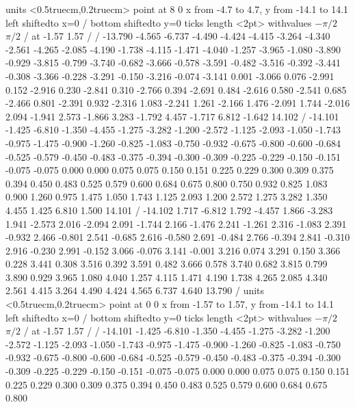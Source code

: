 \figure
\texonly
\vbox{\beginpicture
\normalgraphs
\sevenpoint
\setcoordinatesystem units <0.5truecm,0.2truecm> point at 8 0
\setplotarea x from -4.7 to 4.7, y from -14.1 to 14.1
\axis left shiftedto x=0 /
\axis bottom shiftedto y=0 ticks length <2pt> withvalues 
  {$-\pi/2$} {$\pi/2$} /
  at -1.57 1.57 / /
\setquadratic
{} -13.790 -4.565 -6.737 -4.490 -4.424 -4.415 -3.264 -4.340 -2.561 
-4.265 -2.085 -4.190 -1.738 -4.115 -1.471 -4.040 -1.257 -3.965 -1.080 
-3.890 -0.929 -3.815 -0.799 -3.740 -0.682 -3.666 -0.578 -3.591 -0.482 
-3.516 -0.392 -3.441 -0.308 -3.366 -0.228 -3.291 -0.150 -3.216 -0.074 
-3.141 0.001 -3.066 0.076 -2.991 0.152 -2.916 0.230 -2.841 0.310 
-2.766 0.394 -2.691 0.484 -2.616 0.580 -2.541 0.685 -2.466 0.801 
-2.391 0.932 -2.316 1.083 -2.241 1.261 -2.166 1.476 -2.091 1.744 
-2.016 2.094 -1.941 2.573 -1.866 3.283 -1.792 4.457 -1.717 6.812 
-1.642 14.102 /
 -14.101 -1.425 -6.810 -1.350 -4.455 -1.275 -3.282 -1.200 -2.572 
-1.125 -2.093 -1.050 -1.743 -0.975 -1.475 -0.900 -1.260 -0.825 -1.083 
-0.750 -0.932 -0.675 -0.800 -0.600 -0.684 -0.525 -0.579 -0.450 -0.483 
-0.375 -0.394 -0.300 -0.309 -0.225 -0.229 -0.150 -0.151 -0.075 -0.075 
0.000 0.000 0.075 0.075 0.150 0.151 0.225 0.229 0.300 0.309 
0.375 0.394 0.450 0.483 0.525 0.579 0.600 0.684 0.675 0.800 
0.750 0.932 0.825 1.083 0.900 1.260 0.975 1.475 1.050 1.743 
1.125 2.093 1.200 2.572 1.275 3.282 1.350 4.455 1.425 6.810 
1.500 14.101  /
 -14.102 1.717 -6.812 1.792 -4.457 1.866 -3.283 1.941 -2.573 
2.016 -2.094 2.091 -1.744 2.166 -1.476 2.241 -1.261 2.316 -1.083 
2.391 -0.932 2.466 -0.801 2.541 -0.685 2.616 -0.580 2.691 -0.484 
2.766 -0.394 2.841 -0.310 2.916 -0.230 2.991 -0.152 3.066 -0.076 
3.141 -0.001 3.216 0.074 3.291 0.150 3.366 0.228 3.441 0.308 
3.516 0.392 3.591 0.482 3.666 0.578 3.740 0.682 3.815 0.799 
3.890 0.929 3.965 1.080 4.040 1.257 4.115 1.471 4.190 1.738 
4.265 2.085 4.340 2.561 4.415 3.264 4.490 4.424 4.565 6.737 
4.640 13.790 /
\setcoordinatesystem units <0.5truecm,0.2truecm> point at 0 0
\setplotarea x from -1.57 to 1.57, y from -14.1 to 14.1
\axis left shiftedto x=0 /
\axis bottom shiftedto y=0 ticks length <2pt> withvalues 
  {$-\pi/2$} {$\pi/2$} /
  at -1.57 1.57 / /
\setquadratic
{} -14.101 -1.425 -6.810 -1.350 -4.455 -1.275 -3.282 -1.200 -2.572 
-1.125 -2.093 -1.050 -1.743 -0.975 -1.475 -0.900 -1.260 -0.825 -1.083 
-0.750 -0.932 -0.675 -0.800 -0.600 -0.684 -0.525 -0.579 -0.450 -0.483 
-0.375 -0.394 -0.300 -0.309 -0.225 -0.229 -0.150 -0.151 -0.075 -0.075 
0.000 0.000 0.075 0.075 0.150 0.151 0.225 0.229 0.300 0.309 
0.375 0.394 0.450 0.483 0.525 0.579 0.600 0.684 0.675 0.800 
}
